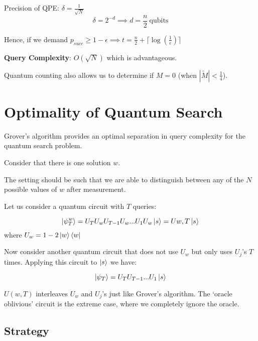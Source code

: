 \documentclass[11.5pt, paper=a4]{article}
\theoremstyle{definition}
\numberwithin{theorem}{section}
\begin{document}
Precision of QPE: $\delta = \frac{1}{\sqrt{N}}$
\begin{equation*}
\delta = 2^{-d} \implies d = \frac{n}{2}   \ \text{qubits}
\end{equation*}


Hence, if we demand $p_{succ} \geq 1 - \epsilon \implies t = \frac{n}{2} + \lceil \log(\frac{1}{\epsilon}) \rceil$

\textbf{Query Complexity}: $O(\sqrt{N})$ which is advantageous.

\vspace{5mm}
Quantum counting also allows us to determine if $M=0$ (when $|\tilde{M}| < \frac{1}{4}$).

\section{Optimality of Quantum Search}

Grover's algorithm provides an optimal separation in query complexity for the quantum search problem.

\vspace{5mm}
Consider that there is one solution $w$.

The setting should be such that we are able to distinguish between any of the $N$ possible values of $w$  after measurement.

\vspace{5mm}
Let us consider a quantum circuit with $T$ queries:

\begin{equation}
    \ket{\psi_{T}^{w}} = U_{T}U_{w}U_{T-1}U_{w} ... U_{1}U_{w} \ket{s} = U{w, T} \ket{s}
\end{equation}
where $U_{w} = 1 - 2\ket{w}\bra{w}$

\vspace{5mm}
Now consider another quantum circuit that does not use $U_w$ but only uses $U_j$'s $T$ times. Applying this circuit to $\ket{s}$ we have:

\begin{equation}
    \ket{\psi_{T}} = U_{T}U_{T-1} ... U_{1} \ket{s}
\end{equation}

$U(w, T)$ interleaves $U_w$ and $U_j$'s just like Grover's algorithm. The `oracle oblivious' circuit is the extreme case, where we completely ignore the oracle.

\subsection*{Strategy}
\end{document}
